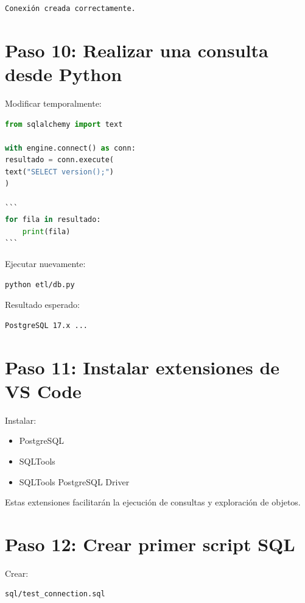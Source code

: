 \begin{verbatim}
Conexión creada correctamente.
\end{verbatim}

\section{Paso 10: Realizar una consulta desde Python}

Modificar temporalmente:

\begin{lstlisting}[language=Python]
from sqlalchemy import text

with engine.connect() as conn:
resultado = conn.execute(
text("SELECT version();")
)

```
for fila in resultado:
    print(fila)
```

\end{lstlisting}

Ejecutar nuevamente:

\begin{lstlisting}[language=bash]
python etl/db.py
\end{lstlisting}

Resultado esperado:

\begin{verbatim}
PostgreSQL 17.x ...
\end{verbatim}

\section{Paso 11: Instalar extensiones de VS Code}

Instalar:

\begin{itemize}
\item PostgreSQL
\item SQLTools
\item SQLTools PostgreSQL Driver
\end{itemize}

Estas extensiones facilitarán la ejecución de consultas y exploración de objetos.

\section{Paso 12: Crear primer script SQL}

Crear:

\begin{verbatim}
sql/test_connection.sql
\end{verbatim}

